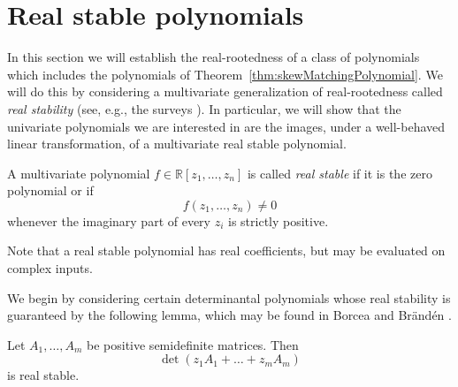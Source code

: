 \documentclass[11pt]{article}
\newcommand{\adam}[1]{{\bf \color{red} Adam: #1}}
\newcommand{\R}{\mathbb{R}}
\newcommand{\mydet}[1]{\det\left(#1\right)}
\begin{document}
\section{Real stable polynomials} \label{sec:real_stability}

In this section we will establish the real-rootedness of a class of polynomials which
  includes the polynomials of Theorem~\ref{thm:skewMatchingPolynomial}.
We will do this by considering a multivariate
generalization of real-rootedness called {\em real stability} (see, e.g., the surveys
\cite{pemantle, wagner}).
In particular, we will show that the univariate polynomials we are interested in are the images,
under a well-behaved linear transformation, of a multivariate real stable polynomial.

\begin{definition}
A multivariate polynomial $f \in \R[z_1, \dots, z_n]$ is called {\em real stable} if it is the zero polynomial
 or if
\[f(z_1, \dots, z_n) \neq 0\]
whenever the imaginary part of every $z_{i}$ is strictly positive.
\end{definition}
Note that a real stable polynomial has real coefficients, but may be evaluated on
complex inputs.

We begin by considering certain determinantal polynomials whose real stability is guaranteed
  by the following lemma, which may be found in 
  Borcea and Br\"{a}nd\'{e}n \cite[Proposition 2.4]{borcea2008applications}.
\begin{lemma}\label{matrixPencils}
Let $A_1, \dots, A_m$ be positive semidefinite matrices.  Then
\[
\mydet{z_1 A_1 + \dots + z_m A_m}
\]
is real stable.
\end{lemma}
%
%
\end{document}
